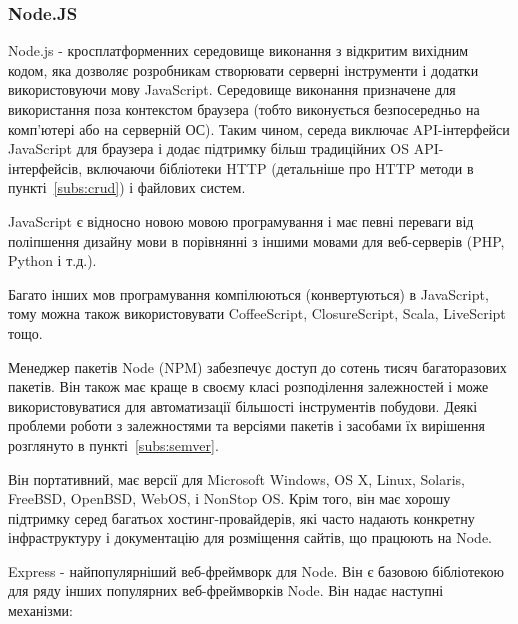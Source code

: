 \subsubsection{Node.JS}

Node.js - кросплатформенних середовище виконання з відкритим вихідним кодом, яка дозволяє розробникам створювати серверні інструменти і додатки використовуючи мову JavaScript. Середовище виконання призначене для використання поза контекстом браузера (тобто виконується безпосередньо на комп'ютері або на серверній ОС). Таким чином, середа виключає API-інтерфейси JavaScript для браузера і додає підтримку більш традиційних OS API-інтерфейсів, включаючи бібліотеки HTTP (детальніше про HTTP методи в пункті~\ref{subs:crud}) і файлових систем.

JavaScript є відносно новою мовою програмування і має певні переваги від поліпшення дизайну мови в порівнянні з іншими мовами для веб-серверів (PHP, Python і т.д.).

Багато інших мов програмування компілюються (конвертуються) в JavaScript, тому можна також використовувати CoffeeScript, ClosureScript, Scala, LiveScript тощо.

Менеджер пакетів Node (NPM) забезпечує доступ до сотень тисяч багаторазових пакетів. Він також має краще в своєму класі розподілення залежностей і може використовуватися для автоматизації більшості інструментів побудови. Деякі проблеми роботи з залежностями та версіями пакетів і засобами їх вирішення розглянуто в пункті~\ref{subs:semver}. 

Він портативний, має версії для Microsoft Windows, OS X, Linux, Solaris, FreeBSD, OpenBSD, WebOS, і NonStop OS. Крім того, він має хорошу підтримку серед багатьох хостинг-провайдерів, які часто надають конкретну інфраструктуру і документацію для розміщення сайтів, що працюють на Node.

Express - найпопулярніший веб-фреймворк для Node. Він є базовою бібліотекою для ряду інших популярних веб-фреймворків Node. Він надає наступні механізми:

